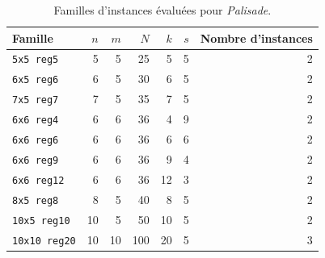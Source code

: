 \begin{table}[H]
\centering
\caption{Familles d'instances évaluées pour \textit{Palisade}.}
\label{tab:palisade-families}
\begin{tabular}{lrrrrrr}
\toprule
Famille & $n$ & $m$ & $N$ & $k$ & $s$ & Nombre d'instances\\
\midrule
\texttt{5x5 reg5} & 5 & 5 & 25 & 5 & 5 & 2\\
\texttt{6x5 reg6} & 6 & 5 & 30 & 6 & 5 & 2\\
\texttt{7x5 reg7} & 7 & 5 & 35 & 7 & 5 & 2\\
\texttt{6x6 reg4} & 6 & 6 & 36 & 4 & 9 & 2\\
\texttt{6x6 reg6} & 6 & 6 & 36 & 6 & 6 & 2\\
\texttt{6x6 reg9} & 6 & 6 & 36 & 9 & 4 & 2\\
\texttt{6x6 reg12} & 6 & 6 & 36 & 12 & 3 & 2\\
\texttt{8x5 reg8} & 8 & 5 & 40 & 8 & 5 & 2\\
\texttt{10x5 reg10} & 10 & 5 & 50 & 10 & 5 & 2\\
\texttt{10x10 reg20} & 10 & 10 & 100 & 20 & 5 & 3\\
\bottomrule
\end{tabular}
\end{table}
